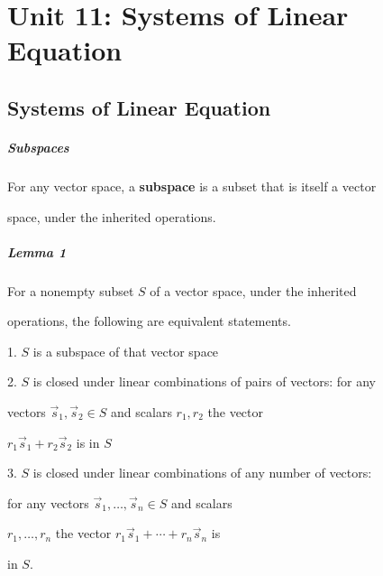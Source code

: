 \chapter{Unit 11: Systems of Linear Equation}
\label{chap:unit11}

\section{Systems of Linear Equation}
\label{sec:systems-of-linear-equation}

\paragraph{Subspaces}



For any vector space, a \textbf{subspace} is a subset that is itself a vector

space, under the inherited operations.



\paragraph{Lemma 1}



For a nonempty subset $S$ of a vector space, under the inherited

operations, the following are equivalent statements.



1.  $S$ is a subspace of that vector space

2.  $S$ is closed under linear combinations of pairs of vectors: for any

    vectors $\vec{s}_1,\vec{s}_2\in S$ and scalars $r_1,r_2$ the vector

    $r_1\vec{s}_1+r_2\vec{s}_2$ is in $S$

3.  $S$ is closed under linear combinations of any number of vectors:

    for any vectors $\vec{s}_1,\ldots,\vec{s}_n\in S$ and scalars

    $r_1, \ldots,r_n$ the vector $r_1\vec{s}_1+\cdots+r_n\vec{s}_n$ is

    in $S$.




